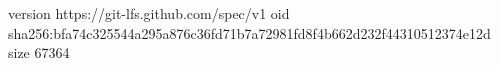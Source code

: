 version https://git-lfs.github.com/spec/v1
oid sha256:bfa74c325544a295a876c36fd71b7a72981fd8f4b662d232f44310512374e12d
size 67364
